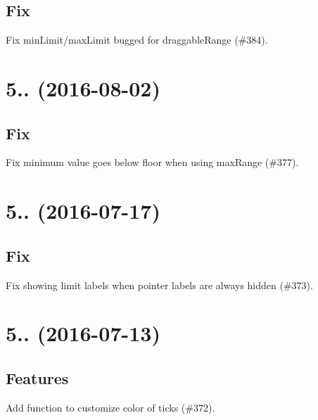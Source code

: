 \subsection*{Fix}


\begin{DoxyItemize}
\item Fix min\+Limit/max\+Limit bugged for draggable\+Range (\#384).
\end{DoxyItemize}

\section*{5.. (2016-\/08-\/02)}

\subsection*{Fix}


\begin{DoxyItemize}
\item Fix minimum value goes below floor when using max\+Range (\#377).
\end{DoxyItemize}

\section*{5.. (2016-\/07-\/17)}

\subsection*{Fix}


\begin{DoxyItemize}
\item Fix showing limit labels when pointer labels are always hidden (\#373).
\end{DoxyItemize}

\section*{5.. (2016-\/07-\/13)}

\subsection*{Features}


\begin{DoxyItemize}
\item Add function to customize color of ticks (\#372).
\end{DoxyItemize}


